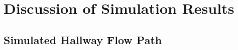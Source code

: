 \documentclass[12pt,oneside]{book}
\begin{document}
%  
% 

%  
% 



\chapter{Discussion of Simulation Results}
\label{sec:discussion}


\section{Simulated Hallway Flow Path}
\label{sec:simulated_flow_path}

\end{document}
